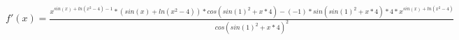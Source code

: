\documentclass[12pt]{article}
\begin{document}
$ f'(x) = \frac{x^{sin(x)+ln(x^{2}-4)-1}*(sin(x)+ln(x^{2}-4))*cos(sin(1)^{2}+x*4)-(-1)*sin(sin(1)^{2}+x*4)*4*x^{sin(x)+ln(x^{2}-4)}}{cos(sin(1)^{2}+x*4)^{2}} $
\end{document}
